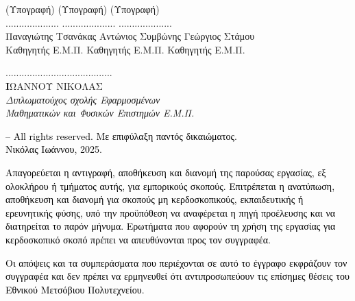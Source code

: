 \documentclass[12pt]{article}
\numberwithin{equation}{section}
\begin{document}
\begin{center}
{ }

\vspace{2cm}

(Υπογραφή)\hspace*{4cm} (Υπογραφή)\hspace*{4cm} (Υπογραφή)\\
\vspace{0.8 cm} 
.................... \hspace*{4cm} ....................\hspace*{4cm}  ....................\\
Παναγιώτης Τσανάκας\hspace*{2.4cm}  Αντώνιος Συμβώνης\hspace*{3cm}  Γεώργιος Στάμου \\
 Καθηγητής Ε.Μ.Π.\hspace*{3cm} 	 Καθηγητής Ε.Μ.Π.\hspace*{3cm}  Καθηγητής Ε.Μ.Π. 


\vspace{2.9 cm} 






\end{center}

\newpage

\vspace*{\fill}
	{\raggedleft ........................................\\
    \textbf ΙΩΑΝΝΟΥ ΝΙΚΟΛΑΣ\\
    \textit{Διπλωματούχος σχολής Εφαρμοσμένων\\
    Μαθηματικών και Φυσικών Επιστημών Ε.Μ.Π.}
    
    }

\vspace*{\fill}


\vspace{2cm}
{
\small
\noindent \textcolor{black}{\textcopyright{} -- All rights reserved. Με επιφύλαξη παντός δικαιώματος.\\ Νικόλας Ιωάννου, 2025.}\\


\vspace{0.1cm}


\noindent\textcolor{black}{ Απαγορεύεται η αντιγραφή, αποθήκευση και διανομή της παρούσας εργασίας, εξ ολοκλήρου ή τμήματος αυτής, για
εμπορικούς σκοπούς. Επιτρέπεται η ανατύπωση, αποθήκευση και διανομή για σκοπούς μη κερδοσκοπικούς, εκπαιδευτικής
ή ερευνητικής φύσης, υπό την προϋπόθεση να αναφέρεται η πηγή προέλευσης και να διατηρείται το παρόν μήνυμα. Ερωτήματα που αφορούν τη χρήση της εργασίας για κερδοσκοπικό σκοπό πρέπει να απευθύνονται προς τον
συγγραφέα.
}

\vspace{0.1cm}

\noindent \textcolor{black}{ Οι απόψεις και τα συμπεράσματα που περιέχονται σε αυτό το έγγραφο εκφράζουν τον συγγραφέα και δεν πρέπει
να ερμηνευθεί ότι αντιπροσωπεύουν τις επίσημες θέσεις του Εθνικού Μετσόβιου Πολυτεχνείου.}}
\end{document}
